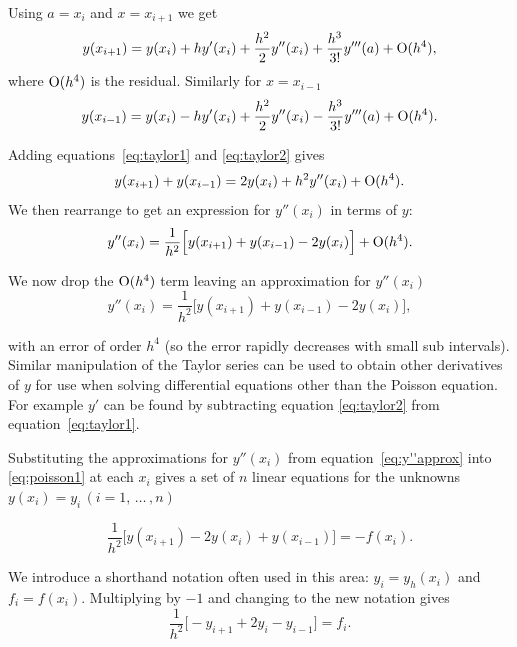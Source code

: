 Using $a=x_{i}$ and $x=x_{i+1}$ we get
\begin{equation}
  y(x_{i+1})=y(x_{i})+hy'(x_{i})+\dfrac{h^{2}}{2}y''(x_{i})+\dfrac{h^{3}}{3!}y'''(a)+\text{O}(h^{4}),
  \label{eq:taylor1}
\end{equation}
where $\text{O}(h^{4})$ is the residual. Similarly for $x=x_{i-1}$
\begin{equation}
  y(x_{i-1})=y(x_{i})-hy'(x_{i})+\dfrac{h^{2}}{2}y''(x_{i})-\dfrac{h^{3}}{3!}y'''(a)+\text{O}(h^{4}).
  \label{eq:taylor2}
\end{equation}

Adding equations~\eqref{eq:taylor1} and \eqref{eq:taylor2} gives
\begin{equation*}
  y(x_{i+1})+y(x_{i-1})=2y(x_{i})+h^{2}y''(x_{i})+\text{O}(h^{4}).
\end{equation*}
We then rearrange to get an expression for $y''(x_{i})$ in terms of $y$:
\begin{equation*}
  y''(x_{i})=\dfrac{1}{h^{2}}\Big[y(x_{i+1})+y(x_{i-1})-2y(x_{i})\Big]+\text{O}(h^{4}).
\end{equation*}

We now drop the $\text{O}(h^{4})$ term leaving an approximation for $y''(x_{i})$
\begin{equation}
  y''(x_{i})=\dfrac{1}{h^{2}}\Big[y(x_{i+1})+y(x_{i-1})-2y(x_{i})\Big],
  \label{eq:y''approx}
\end{equation}

with an error of order $h^{4}$ (so the error rapidly decreases with small
sub intervals). Similar manipulation of the Taylor series can be used to obtain
other derivatives of $y$ for use when solving differential equations other than
the Poisson equation. For example $y'$ can be found by subtracting equation
\eqref{eq:taylor2} from equation~\eqref{eq:taylor1}.

Substituting the approximations for $y''(x_{i})$ from equation~\eqref{eq:y''approx}
into \eqref{eq:poisson1} at each $x_{i}$ gives a set of $n$ linear
equations for the unknowns $y(x_i) = y_i \, (i=1 , \, \ldots \, , n)$

\begin{equation*}
  \dfrac{1}{h^{2}}\Big[y(x_{i+1})-2y(x_{i})+y(x_{i-1})\Big]=-f(x_{i}).
\end{equation*}

We introduce a shorthand notation often used in this area: $y_{i}=y_{h}(x_{i})$
and $f_{i}=f(x_{i})$. Multiplying by $-1$ and changing to the new
notation gives
\begin{equation}
  \dfrac{1}{h^{2}}\Big[-y_{i+1}+2y_{i}-y_{i-1}\Big]=f_{i}.
  \label{eq:23}
\end{equation}

